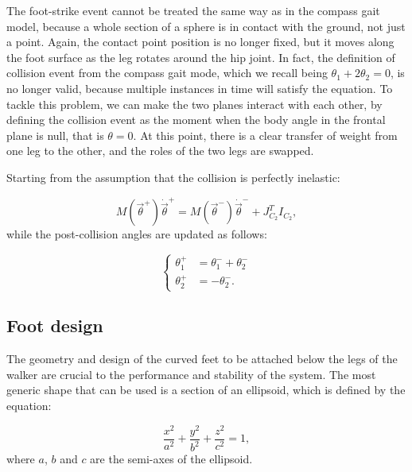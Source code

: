 The foot-strike event cannot be treated the same way as in the compass gait model, because a whole section of a sphere is in contact with the ground, not just a point.
Again, the contact point position is no longer fixed, but it moves along the foot surface as the leg rotates around the hip joint.
In fact, the definition of collision event from the compass gait mode,  which we recall being $\theta_1 + 2\theta_2 = 0$, is no longer valid, because multiple instances in time will satisfy the equation.
To tackle this problem, we can make the two planes interact with each other, by defining the collision event as the moment when the body angle in the frontal plane is null, that is $\theta = 0$.
At this point, there is a clear transfer of weight from one leg to the other, and the roles of the two legs are swapped.

Starting from the assumption that the collision is perfectly inelastic:

\begin{equation}\label{eq:footstrike}
    M(\vec{\theta}^+)\dot{\vec{\theta}}^+ = M(\vec{\theta}^-)\dot{\vec{\theta}}^- + J_{C_2}^T I_{C_2},
\end{equation}
while the post-collision angles are updated as follows:

\begin{equation}
    \begin{cases}
        \theta_1^+ &= \theta_1^- + \theta_2^-\\
        \theta_2^+ &= -\theta_2^-.
    \end{cases}
\end{equation}

\subsection{Foot design}
The geometry and design of the curved feet to be attached below the legs of the walker are crucial to the performance and stability of the system.
The most generic shape that can be used is a section of an ellipsoid, which is defined by the equation:

\begin{equation}\label{eq:ellipsoid}
    \frac{x^2}{a^2} + \frac{y^2}{b^2} + \frac{z^2}{c^2} = 1,
\end{equation}
where $a$, $b$ and $c$ are the semi-axes of the ellipsoid.



